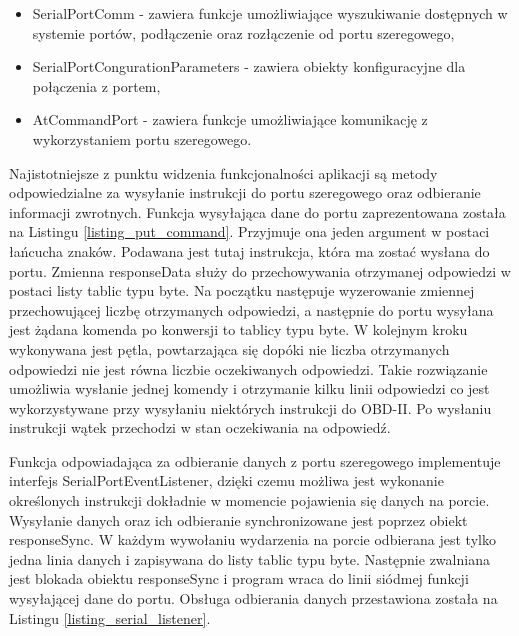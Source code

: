 \documentclass[12pt, twoside]{article} %
\numberwithin{equation}{subsection}
\numberwithin{figure}{section}
\numberwithin{table}{section}
\begin{document}
	\begin{itemize}
		\item{SerialPortComm - zawiera funkcje umożliwiające wyszukiwanie dostępnych w systemie portów, podłączenie oraz rozłączenie od portu szeregowego,}
		\item{SerialPortCongurationParameters - zawiera obiekty konfiguracyjne dla połączenia z portem,}
		\item{AtCommandPort - zawiera funkcje umożliwiające komunikację z wykorzystaniem portu szeregowego.}
	\end{itemize}
	
	Najistotniejsze z punktu widzenia funkcjonalności aplikacji są metody odpowiedzialne za wysyłanie instrukcji do portu szeregowego oraz odbieranie informacji zwrotnych. Funkcja wysyłająca dane do portu zaprezentowana została na Listingu \ref{listing_put_command}. Przyjmuje ona jeden argument w postaci łańcucha znaków. Podawana jest tutaj instrukcja, która ma zostać wysłana do portu. Zmienna responseData służy do przechowywania otrzymanej odpowiedzi w postaci listy tablic typu byte. Na początku następuje wyzerowanie zmiennej przechowującej liczbę otrzymanych odpowiedzi, a następnie do portu wysyłana jest żądana komenda po konwersji to tablicy typu byte. W kolejnym kroku wykonywana jest pętla, powtarzająca się dopóki nie liczba otrzymanych odpowiedzi nie jest równa liczbie oczekiwanych odpowiedzi. Takie rozwiązanie umożliwia wysłanie jednej komendy i otrzymanie kilku linii odpowiedzi co jest wykorzystywane przy wysyłaniu niektórych instrukcji do OBD-II. Po wysłaniu instrukcji wątek przechodzi w stan oczekiwania na odpowiedź.
	
	\newpage
	
	
	
	Funkcja odpowiadająca za odbieranie danych z portu szeregowego implementuje interfejs SerialPortEventListener, dzięki czemu możliwa jest wykonanie określonych instrukcji dokładnie w momencie pojawienia się danych na porcie. Wysyłanie danych oraz ich odbieranie synchronizowane jest poprzez obiekt responseSync. W każdym wywołaniu wydarzenia na porcie odbierana jest tylko jedna linia danych i zapisywana do listy tablic typu byte. Następnie zwalniana jest blokada obiektu responseSync i program wraca do linii siódmej funkcji wysyłającej dane do portu. Obsługa odbierania danych przestawiona została na Listingu \ref{listing_serial_listener}. \\
	
\end{document}
